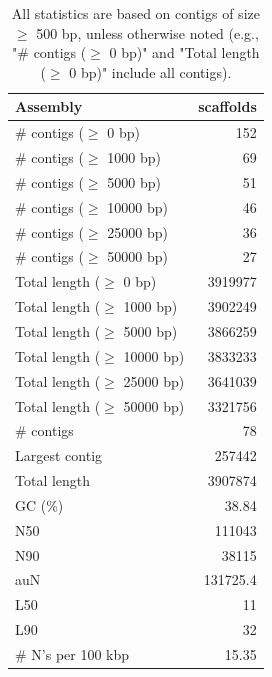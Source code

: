 \documentclass[12pt,a4paper]{article}
\begin{document}
\begin{table}[ht]
\begin{center}
\caption{All statistics are based on contigs of size $\geq$ 500 bp, unless otherwise noted (e.g., "\# contigs ($\geq$ 0 bp)" and "Total length ($\geq$ 0 bp)" include all contigs).}
\begin{tabular}{|l*{1}{|r}|}
\hline
Assembly & scaffolds \\ \hline
\# contigs ($\geq$ 0 bp) & 152 \\ \hline
\# contigs ($\geq$ 1000 bp) & 69 \\ \hline
\# contigs ($\geq$ 5000 bp) & 51 \\ \hline
\# contigs ($\geq$ 10000 bp) & 46 \\ \hline
\# contigs ($\geq$ 25000 bp) & 36 \\ \hline
\# contigs ($\geq$ 50000 bp) & 27 \\ \hline
Total length ($\geq$ 0 bp) & 3919977 \\ \hline
Total length ($\geq$ 1000 bp) & 3902249 \\ \hline
Total length ($\geq$ 5000 bp) & 3866259 \\ \hline
Total length ($\geq$ 10000 bp) & 3833233 \\ \hline
Total length ($\geq$ 25000 bp) & 3641039 \\ \hline
Total length ($\geq$ 50000 bp) & 3321756 \\ \hline
\# contigs & 78 \\ \hline
Largest contig & 257442 \\ \hline
Total length & 3907874 \\ \hline
GC (\%) & 38.84 \\ \hline
N50 & 111043 \\ \hline
N90 & 38115 \\ \hline
auN & 131725.4 \\ \hline
L50 & 11 \\ \hline
L90 & 32 \\ \hline
\# N's per 100 kbp & 15.35 \\ \hline
\end{tabular}
\end{center}
\end{table}
\end{document}
